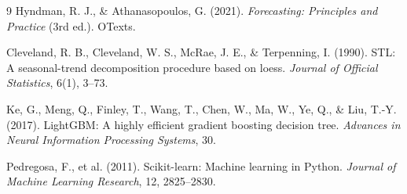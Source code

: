 \begin{thebibliography}{9}
\small
{}
Hyndman, R. J., \& Athanasopoulos, G. (2021).
\textit{Forecasting: Principles and Practice} (3rd ed.). OTexts.

Cleveland, R. B., Cleveland, W. S., McRae, J. E., \& Terpenning, I. (1990).
STL: A seasonal-trend decomposition procedure based on loess.
\textit{Journal of Official Statistics}, 6(1), 3--73.

Ke, G., Meng, Q., Finley, T., Wang, T., Chen, W., Ma, W., Ye, Q., \& Liu, T.-Y. (2017).
LightGBM: A highly efficient gradient boosting decision tree.
\textit{Advances in Neural Information Processing Systems}, 30.

Pedregosa, F., et al. (2011).
Scikit-learn: Machine learning in Python.
\textit{Journal of Machine Learning Research}, 12, 2825--2830.
\end{thebibliography}

